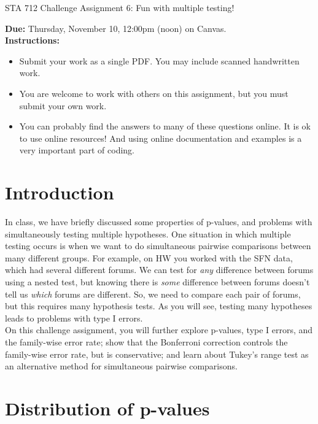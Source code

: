 \documentclass[11pt]{article}
\begin{document}
\begin{center}
\Large
STA 712 Challenge Assignment 6: Fun with multiple testing!\\
\normalsize
\vspace{5mm}
\end{center}

\noindent \textbf{Due:} Thursday, November 10, 12:00pm (noon) on Canvas.\\ 

\noindent \textbf{Instructions:} 
\begin{itemize}
\item Submit your work as a single PDF. You may include scanned handwritten work.
\item You are welcome to work with others on this assignment, but you must submit your own work.
\item You can probably find the answers to many of these questions online. It is ok to use online resources! And using online documentation and examples is a very important part of coding.
\end{itemize}

\section*{Introduction}

In class, we have briefly discussed some properties of p-values, and problems with simultaneously testing multiple hypotheses. One situation in which multiple testing occurs is when we want to do simultaneous pairwise comparisons between many different groups. For example, on HW you worked with the SFN data, which had several different forums. We can test for \textit{any} difference between forums using a nested test, but knowing there is \textit{some} difference between forums doesn't tell us \textit{which} forums are different. So, we need to compare each pair of forums, but this requires many hypothesis tests. As you will see, testing many hypotheses leads to problems with type I errors.\\

\noindent On this challenge assignment, you will further explore p-values, type I errors, and the family-wise error rate; show that the Bonferroni correction controls the family-wise error rate, but is conservative; and learn about Tukey's range test as an alternative method for simultaneous pairwise comparisons.

\section*{Distribution of p-values}
\end{document}
